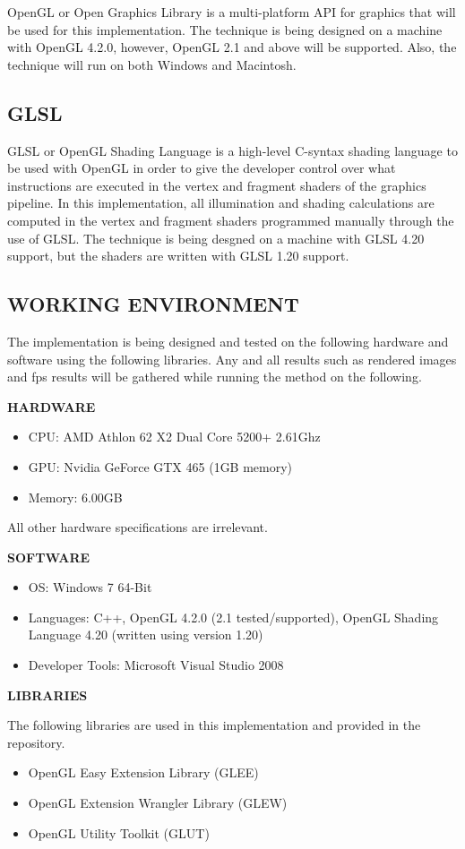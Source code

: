 OpenGL or Open Graphics Library is a multi-platform API for graphics that will be used for this implementation.  The technique is being designed on a machine with OpenGL 4.2.0, however, OpenGL 2.1 and above will be supported.  Also, the technique will run on both Windows and Macintosh.

\subsection{GLSL}

GLSL or OpenGL Shading Language is a high-level C-syntax shading language to be used with OpenGL in order to give the developer control over what instructions are executed in the vertex and fragment shaders of the graphics pipeline.  In this implementation, all illumination and shading calculations are computed in the vertex and fragment shaders programmed manually through the use of GLSL.  The technique is being desgned on a machine with GLSL 4.20 support, but the shaders are written with GLSL 1.20 support.

\subsection{WORKING ENVIRONMENT}

The implementation is being designed and tested on the following hardware and software using the following libraries.  Any and all results such as rendered images and fps results will be gathered while running the method on the following.

\vspace{10 mm}

\textbf{HARDWARE}
\begin{itemize}
\item CPU: AMD Athlon 62 X2 Dual Core 5200+ 2.61Ghz
\item GPU: Nvidia GeForce GTX 465 (1GB memory)
\item Memory: 6.00GB
\end{itemize}

All other hardware specifications are irrelevant.

\vspace{10 mm}

\textbf{SOFTWARE}
\begin{itemize}
\item OS: Windows 7 64-Bit
\item Languages: C++, OpenGL 4.2.0 (2.1 tested/supported), OpenGL Shading Language 4.20 (written using version 1.20)
\item Developer Tools: Microsoft Visual Studio 2008
\end{itemize}

\vspace{10 mm}

\textbf{LIBRARIES}

\vspace{1 mm}

The following libraries are used in this implementation and provided in the repository.

\begin{itemize}
\item OpenGL Easy Extension Library (GLEE)
\item OpenGL Extension Wrangler Library (GLEW)
\item OpenGL Utility Toolkit (GLUT)
\end{itemize}

